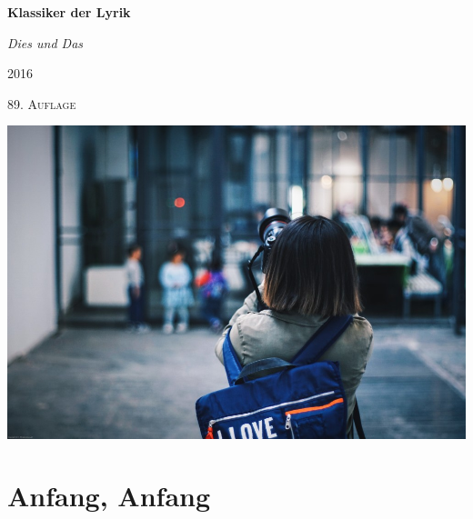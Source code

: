 \documentclass[12pt]{book}
\begin{document}
\frontmatter

\begin{titlepage}
	\centering
	\vspace{3cm}
	{\huge\bfseries Klassiker der Lyrik\par}
	\vspace{1.5cm}
	{\Large\itshape Dies und Das\par}
	\vfill
	2016 \par
	\textsc{89. Auflage}

	\vfill

\end{titlepage}



\mbox{}
\thispagestyle{empty}
\newpage

\includegraphics[width=1\textwidth]{images/photo1000.jpg}

\newpage

\tableofcontents

\mainmatter

\chapter{Anfang, Anfang}
\label{chap:Anfang, Anfang}
\end{document}
